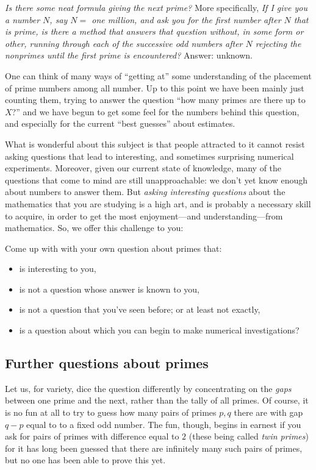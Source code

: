 \documentclass[11pt,draft]{article}
\theoremstyle{plain}
\theoremstyle{definition}
\numberwithin{equation}{section}
\numberwithin{figure}{section}
\numberwithin{table}{section}
\begin{document}
{\em Is there some neat formula giving the next prime?} More
specifically, {\em If I give you a number $N$, say $N=$ one million,
  and ask you for the first number after $N$ that is prime, is there a
  method that answers that question without, in some form or other,
  running through each of the successive odd numbers after $N$ rejecting
  the nonprimes until the first prime is encountered?}  Answer:
unknown.

\bigskip

One can think of many ways of ``getting at'' some understanding of the
placement of prime numbers among all number.  Up to this point we have
been mainly just counting them, trying to answer the question ``how
many primes are there up to $X$?''  and we have begun to get some feel
for the numbers behind this question, and especially for the current
``best guesses'' about estimates.
   

What is wonderful about this subject is that people attracted to it
cannot resist asking questions that lead to interesting, and sometimes
surprising numerical experiments. Moreover, given our current state of
knowledge, many of the questions that come to mind are still
unapproachable: we don't yet know enough about numbers to answer them.
But {\it asking interesting questions} about the mathematics that you
are studying is a high art, and is probably a necessary skill to
acquire, in order to get the most enjoyment---and understanding---from
mathematics.  So, we offer this challenge to you:

Come up with with your own question about primes that:
 
 \begin{itemize}
 \item     is interesting to you,
  \item    is not a question whose answer is known to you,
 \item     is not a question that you've seen before; or at least not exactly,
  \item    is a question about which you can begin to make numerical investigations? 
 \end{itemize}
 
\subsection{Further questions about primes} 

Let us, for variety, dice the question differently by concentrating on
the {\em gaps} between one prime and the next, rather than the tally
of all primes. Of course, it is no fun at all to try to guess how many
pairs of primes $p, q$ there are with gap $q-p$ equal to to a fixed
odd number.  The fun, though, begins in earnest if you ask for pairs
of primes with difference equal to $2$ (these being called {\em twin
  primes}) for it has long been guessed that there are infinitely many
such pairs of primes, but no one has been able to prove this yet.
\end{document}
